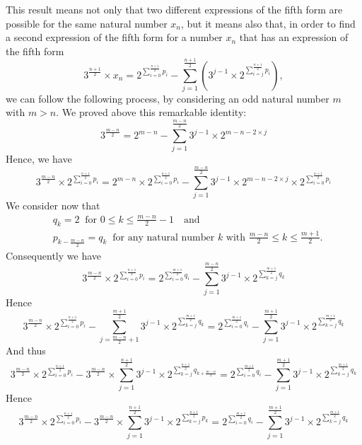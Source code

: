 \documentclass[11pt,a4paper]{article}
\newcommand{\Pf}[4]{2^{\sum_{#4=0}^{#1}#3_{#4}}-\sum_{j=1}^{#2}\left(3^{j-1}\times 2^{\sum_{#4=j}^{#1}#3_{#4}}\right)}
\theoremstyle{definition}
\begin{document}
This result means not only that two different expressions of the fifth form are possible
for the same natural number $x_n$, but it means also that, in order to find a second
expression of the fifth form for a number $x_n$ that has an expression of the fifth form
\[3^{\frac{n+1}{2}}\times x_n=\Pf{\frac{n+1}{2}}{\frac{n+1}{2}}{p}{i},\]
we can follow the following process, by considering an odd natural number $m$ with $m>n$.
We proved above this remarkable identity:
\begin{equation}
3^{\frac{m-n}{2}}=2^{m-n}-\sum_{j=1}^{\frac{m-n}{2}}3^{j-1}\times 2^{m-n-2\times j}
\end{equation}
Hence, we have
\begin{equation}
3^{\frac{m-n}{2}}\times 2^{\sum_{i=0}^{\frac{n+1}{2}}p_i}=2^{m-n}\times 2^{\sum_{i=0}^{\frac{n+1}{2}}p_i}-\sum_{j=1}^{\frac{m-n}{2}}3^{j-1}\times 2^{m-n-2\times j}\times 2^{\sum_{i=0}^{\frac{n+1}{2}}p_i}
\end{equation}
We consider now that
\begin{equation}
\begin{split}
&q_k=2\ \text{ for }0\le k\le\frac{m-n}{2}-1\quad\text{and}\\
&p_{k-\frac{m-n}{2}}=q_k\ \text{ for any natural number }k\text{ with }\frac{m-n}{2}\le k\le\frac{m+1}{2}.
\end{split}
\end{equation}
Consequently we have
\begin{equation}
3^{\frac{m-n}{2}}\times 2^{\sum_{i=0}^{\frac{n+1}{2}}p_i}=2^{\sum_{i=0}^{\frac{m+1}{2}}q_i}-\sum_{j=1}^{\frac{m-n}{2}}3^{j-1}\times 2^{\sum_{k=j}^{\frac{m+1}{2}}q_k}
\end{equation}
Hence
\begin{equation}
3^{\frac{m-n}{2}}\times 2^{\sum_{i=0}^{\frac{n+1}{2}}p_i}-\sum_{j=\frac{m-n}{2}+1}^{\frac{m+1}{2}}3^{j-1}\times 2^{\sum_{k=j}^{\frac{m+1}{2}}q_k}=2^{\sum_{i=0}^{\frac{m+1}{2}}q_i}-\sum_{j=1}^{\frac{m+1}{2}}3^{j-1}\times 2^{\sum_{k=j}^{\frac{m+1}{2}}q_k}
\end{equation}
And thus
\begin{equation}
3^{\frac{m-n}{2}}\times 2^{\sum_{i=0}^{\frac{n+1}{2}}p_i}-3^{\frac{m-n}{2}}\times\sum_{j=1}^{\frac{n+1}{2}}3^{j-1}\times 2^{\sum_{k=j}^{\frac{n+1}{2}}q_{k+\frac{m-n}{2}}}=2^{\sum_{i=0}^{\frac{m+1}{2}}q_i}-\sum_{j=1}^{\frac{m+1}{2}}3^{j-1}\times 2^{\sum_{k=j}^{\frac{m+1}{2}}q_k}
\end{equation}
Hence
\begin{equation}
3^{\frac{m-n}{2}}\times 2^{\sum_{i=0}^{\frac{n+1}{2}}p_i}-3^{\frac{m-n}{2}}\times\sum_{j=1}^{\frac{n+1}{2}}3^{j-1}\times 2^{\sum_{k=j}^{\frac{n+1}{2}}p_k}=2^{\sum_{i=0}^{\frac{m+1}{2}}q_i}-\sum_{j=1}^{\frac{m+1}{2}}3^{j-1}\times 2^{\sum_{k=j}^{\frac{m+1}{2}}q_k}
\end{equation}
\end{document}
